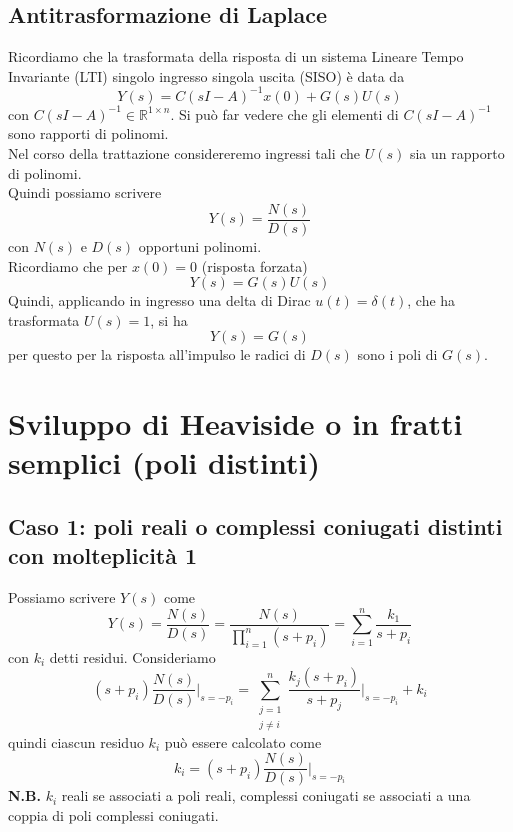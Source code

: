 \documentclass{article}
\numberwithin{equation}{subsection}
\let\oldsection\section%
\renewcommand{\section}{%
  \renewcommand{\theequation}{\thesection.\arabic{equation}}%
  \oldsection}%
\let\oldsubsection\subsection%
\renewcommand{\subsection}{%
  \renewcommand{\theequation}{\thesubsection.\arabic{equation}}%
  \oldsubsection}%
\begin{document}
\subsection{Antitrasformazione di Laplace}
Ricordiamo che la trasformata della risposta di un sistema Lineare Tempo Invariante (LTI) singolo ingresso singola uscita (SISO) è data da
\[
    Y(s) = C(sI-A)^{-1} x(0) + G(s)U(s)
\]
con $C(sI-A)^{-1} \in \mathbb{R}^{1 \times n}$. Si può far vedere che gli elementi di $C(sI-A)^{-1}$ sono rapporti di polinomi.\\
Nel corso della trattazione considereremo ingressi tali che $U (s)$ sia un rapporto di polinomi.
\vspace*{0.2cm}\\
Quindi possiamo scrivere 
\begin{equation}
    Y(s) = \frac{N(s)}{D(s)}
\end{equation}
con $N (s)$ e $D(s)$ opportuni polinomi.
\vspace*{0.2cm}\\
Ricordiamo che per $x(0)=0$ (risposta forzata)
\[
    Y(s)=G(s)U(s)
\]  
Quindi, applicando in ingresso una delta di Dirac $u(t)=\delta(t)$, che ha trasformata $U(s)=1$, si ha
\[
    Y(s) = G(s)  
\]
per questo per la risposta all'impulso le radici di $D(s)$ sono i poli di $G(s)$.





\section{Sviluppo di Heaviside o in fratti semplici (poli distinti)}
\subsection{Caso 1: poli reali o complessi coniugati distinti con molteplicità 1}
Possiamo scrivere $Y(s)$ come 
\begin{equation*}
    Y(s) = \frac{N(s)}{D(s)} = \frac{N(s)}{\prod_{i=1}^n (s + p_i)} = \sum_{i=1}^n \frac{k_1}{s+p_i}
\end{equation*}
con $k_i$ detti residui. Consideriamo
\begin{equation*}
    (s+p_i) \frac{N(s)}{D(s)} \bigg|_{s = -p_i} = \sum_{\substack{j=1 \\ j\neq i}}^n \frac{k_j(s+p_i)}{s+p_j} \bigg|_{s=-p_i} + k_i
\end{equation*}
quindi ciascun residuo $k_i$ può essere calcolato come
\begin{equation}
    k_i = (s+p_i) \frac{N(s)}{D(s)} \bigg|_{s=-p_i}
\end{equation}
\textbf{N.B.} $k_i$ reali se associati a poli reali, complessi coniugati se associati a una coppia di poli complessi coniugati.
\end{document}
